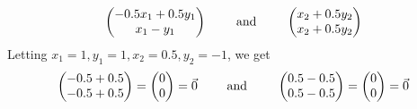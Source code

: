 \documentclass[12pt]{article}
\begin{document}
\newpage
\[
\begin{pmatrix}-0.5x_{1}+0.5y_{1}\\x_{1}-y_{1}\end{pmatrix} %
 \hphantom{1000}
 \text{ and }
 \hphantom{1000}
\begin{pmatrix}x_{2}+0.5y_{2}\\x_{2}+0.5y_{2}\end{pmatrix}%
\]
Letting $x_{1}=1,y_{1}=1,x_{2}=0.5,y_{2}=-1$, we get
\[
\begin{pmatrix}-0.5+0.5\\-0.5+0.5\end{pmatrix} =\begin{pmatrix}0\\0\end{pmatrix} =\vec{0} %
 \hphantom{1000}
 \text{ and }
 \hphantom{1000}
\begin{pmatrix}0.5-0.5\\0.5-0.5\end{pmatrix} =\begin{pmatrix}0\\0\end{pmatrix} =\vec{0} %
\]
\end{document}
